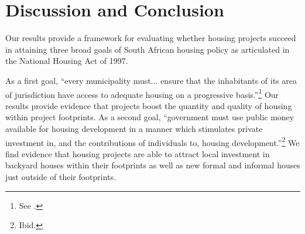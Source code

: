 \documentclass[12pt]{article}
\begin{document}




\section{Discussion and Conclusion}\label{section:discussion}


Our results provide a framework for evaluating whether housing projects succeed in attaining three broad goals of South African housing policy as articulated in the National Housing Act of 1997.

As a first goal, ``every municipality must... ensure that the inhabitants of its area of jurisdiction have access to adequate housing on a progressive basis.''\footnote{See \cite{housingact}.}  Our results provide evidence that projects boost the quantity and quality of housing within project footprints.  As a second goal, ``government must use public money available for housing development in a manner which stimulates private investment in, and the contributions of individuals to, housing development.''\footnote{Ibid.}    We find evidence that housing projects are able to attract local investment in backyard houses within their footprints as well as new formal and informal houses just outside of their footprints.  
\end{document}
